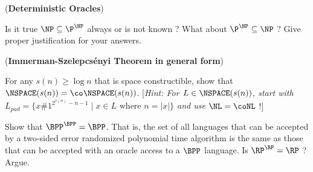 \documentclass[12pt, a4paper,answers]{exam}
\begin{document}
\begin{questions}
\question[5] (\textbf{Deterministic Oracles}) 

Is it true $\NP \subseteq \P^{\NP}$ always or is not known ?  What about $\P^{\NP} \subseteq \NP$ ? Give proper justification for your answers.


\question[5] (\textbf{Immerman-Szelepcs\'enyi Theorem in general form}) 

For any $s(n) \ge \log n$ that is space constructible, show that $\NSPACE(s(n)) = \co\NSPACE(s(n))$. [\textit{Hint: For $L \in \NSPACE(s(n))$, start with $L_{pad} = \{x \# 1^{2^{s(n)}-n-1} \mid x \in L\text{ where } n=|x|\}$  and use $\NL=\coNL$} !] 


\question[15] Show that $\BPP^\BPP = \BPP$. That is, the set of all languages that can be accepted by a two-sided error randomized polynomial time  algorithm is the same as those that can be accepted with an oracle access to a $\BPP$ language. Is $\RP^\RP = \RP$ ? Argue.



\end{questions}
\end{document}
